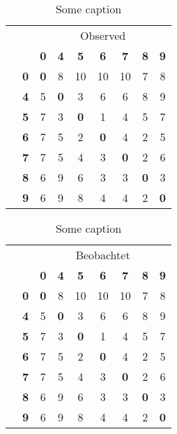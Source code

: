 \documentclass{article}
\newcommand*\rot{\rotatebox{90}}
\begin{document}
\begin{table} \centering
    \begin{tabular}{ccccccccc}
        & & \multicolumn{7}{c}{Observed} \\[2ex]
        & & \textbf{0} & \textbf{4} & \textbf{5} & \textbf{6} & \textbf{7} & \textbf{8} & \textbf{9} \\
        \cmidrule{3-9}
        & \textbf{0} &  \textbf{0} &  8 & 10 & 10 & 10 &  7 &  8 \\ 
        & \textbf{4} &  5 &  \textbf{0} &  3 &  6 &  6 &  8 &  9 \\ 
        & \textbf{5} &  7 &  3 &  \textbf{0} &  1 &  4 &  5 &  7 \\ 
        & \textbf{6} &  7 &  5 &  2 &  \textbf{0} &  4 &  2 &  5 \\ 
        & \textbf{7} &  7 &  5 &  4 &  3 &  \textbf{0} &  2 &  6 \\ 
        & \textbf{8} &  6 &  9 &  6 &  3 &  3 &  \textbf{0} &  3 \\ 
 \rot{\rlap{~Forecasted}}
        & \textbf{9} &  6 &  9 &  8 &  4 &  4 &  2 &  \textbf{0} \\ 
        \cmidrule[1pt]{3-9}
    \end{tabular}
    \caption{Some caption}
\end{table}


\begin{table} \centering
    \begin{tabular}{ccccccccc}
        & & \multicolumn{7}{c}{Beobachtet} \\[2ex]
        & & \textbf{0} & \textbf{4} & \textbf{5} & \textbf{6} & \textbf{7} & \textbf{8} & \textbf{9} \\
        \cmidrule{3-9}
        & \textbf{0} &  \textbf{0} &  8 & 10 & 10 & 10 &  7 &  8 \\ 
        & \textbf{4} &  5 &  \textbf{0} &  3 &  6 &  6 &  8 &  9 \\ 
        & \textbf{5} &  7 &  3 &  \textbf{0} &  1 &  4 &  5 &  7 \\ 
        & \textbf{6} &  7 &  5 &  2 &  \textbf{0} &  4 &  2 &  5 \\ 
        & \textbf{7} &  7 &  5 &  4 &  3 &  \textbf{0} &  2 &  6 \\ 
        & \textbf{8} &  6 &  9 &  6 &  3 &  3 &  \textbf{0} &  3 \\ 
 \rot{\rlap{~Vorhergesagt}}
        & \textbf{9} &  6 &  9 &  8 &  4 &  4 &  2 &  \textbf{0} \\ 
        \cmidrule[1pt]{3-9}
    \end{tabular}
    \caption{Some caption}
\end{table}
\end{document}

